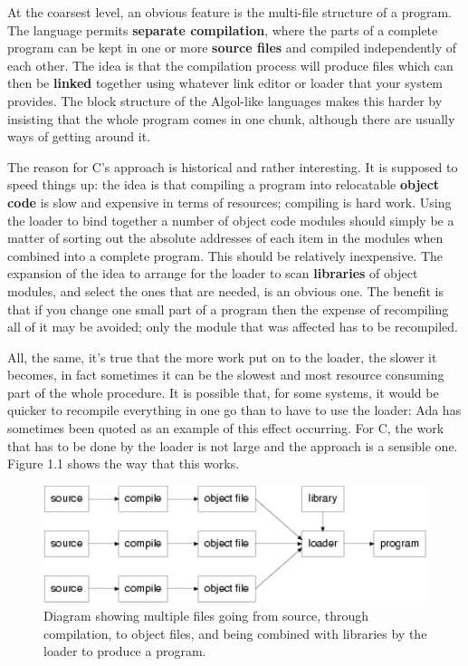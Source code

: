   At the coarsest level, an obvious feature is the multi-file structure of a
   program. The language permits \textbf{separate compilation}, where the
   parts of a complete program can be kept in one or more \textbf{source
   files} and compiled independently of each other. The idea is that the
   compilation process will produce files which can then be \textbf{linked}
   together using whatever link editor or loader that your system provides. The
   block structure of the Algol-like languages makes this harder by insisting
   that the whole program comes in one chunk, although there are usually ways
   of getting around it.


  The reason for C's approach is historical and rather interesting. It is
   supposed to speed things up: the idea is that compiling a program into
   relocatable \textbf{object code} is slow and expensive in terms of
   resources; compiling is hard work. Using the loader to bind together a
   number of object code modules should simply be a matter of sorting out the
   absolute addresses of each item in the modules when combined into a complete
   program. This should be relatively inexpensive. The expansion of the idea to
   arrange for the loader to scan \textbf{libraries} of object modules, and
   select the ones that are needed, is an obvious one. The benefit is that if
   you change one small part of a program then the expense of recompiling all
   of it may be avoided; only the module that was affected has to be
   recompiled.


  All, the same, it's true that the more work put on to the loader, the
   slower it becomes, in fact sometimes it can be the slowest and most resource
   consuming part of the whole procedure. It is possible that, for some
   systems, it would be quicker to recompile everything in one go than to have
   to use the loader: Ada has sometimes been quoted as an example of this
   effect occurring. For C, the work that has to be done by the loader is not
   large and the approach is a sensible one. Figure 1.1 shows the
   way that this works.


  \begin{figure}\centering\includegraphics[type=pdf,read=.pdf,ext=.pdf,scale=1.0]{figure/1.1}\caption{Diagram showing multiple files going from source, through           compilation, to object files, and being combined with libraries by           the loader to produce a program.}\end{figure}


